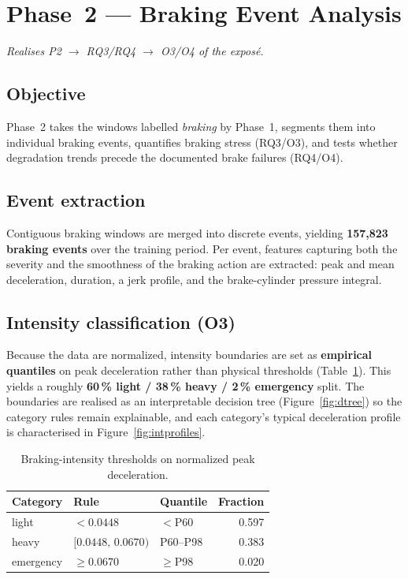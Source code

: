 \documentclass[11pt,a4paper]{article}
\begin{document}
\setcounter{section}{5}
\section{Phase~2 --- Braking Event Analysis}
\label{sec:phase2}

\textit{Realises P2 $\rightarrow$ RQ3/RQ4 $\rightarrow$ O3/O4 of the exposé.}

\subsection{Objective}
Phase~2 takes the windows labelled \emph{braking} by Phase~1, segments them into
individual braking events, quantifies braking stress (RQ3/O3), and tests whether
degradation trends precede the documented brake failures (RQ4/O4).

\subsection{Event extraction}
Contiguous braking windows are merged into discrete events, yielding
\textbf{157{,}823 braking events} over the training period. Per event, features
capturing both the severity and the smoothness of the braking action are extracted:
peak and mean deceleration, duration, a jerk profile, and the brake-cylinder pressure
integral.

\subsection{Intensity classification (O3)}
Because the data are normalized, intensity boundaries are set as \textbf{empirical
quantiles} on peak deceleration rather than physical thresholds
(Table~\ref{tab:intensity}). This yields a roughly \textbf{60\,\% light / 38\,\% heavy /
2\,\% emergency} split. The boundaries are realised as an interpretable decision tree
(Figure~\ref{fig:dtree}) so the category rules remain explainable, and each category's
typical deceleration profile is characterised in Figure~\ref{fig:intprofiles}.

\begin{table}[H]
\centering
\caption{Braking-intensity thresholds on normalized peak deceleration.}
\label{tab:intensity}
\small
\begin{tabular}{l l l r}
\toprule
Category & Rule & Quantile & Fraction\\
\midrule
light & $<0.0448$ & $<$P60 & 0.597\\
heavy & $[0.0448,\,0.0670)$ & P60--P98 & 0.383\\
emergency & $\geq 0.0670$ & $\geq$P98 & 0.020\\
\bottomrule
\end{tabular}
\end{table}
\end{document}
